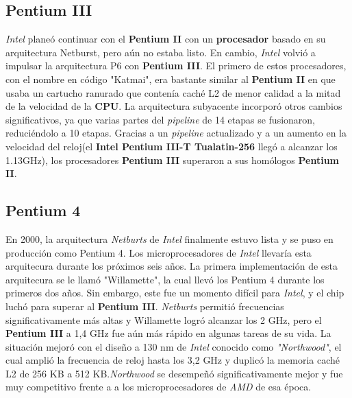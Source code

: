 \subsection{\textbf{Pentium III}}
\emph{Intel} planeó continuar con el \textbf{Pentium II} con un \textbf{procesador} basado en su arquitectura Netburst, pero aún no estaba listo. En cambio, \emph{Intel} volvió a impulsar la 
arquitectura P6 con \textbf{Pentium III}. El primero de estos procesadores, con el nombre en código "Katmai", era bastante similar al \textbf{Pentium II} en que usaba un cartucho 
ranurado que contenía caché L2 de menor calidad a la mitad de la velocidad de la \textbf{CPU}. La arquitectura subyacente incorporó otros cambios significativos, ya que varias 
partes del \emph{pipeline} de 14 etapas se fusionaron, reduciéndolo a 10 etapas. Gracias a un \emph{pipeline} actualizado y a un aumento en la velocidad del 
reloj(el \textbf{Intel Pentium III-T Tualatin-256} llegó a alcanzar los 1.13GHz), los procesadores \textbf{Pentium III} superaron a sus homólogos \textbf{Pentium II}.

\subsection{\textbf{Pentium 4}}
En 2000, la arquitectura \emph{Netburts} de \emph{Intel} finalmente estuvo lista y se puso en producción como Pentium 4. Los microprocesadores de \emph{Intel} llevaría esta 
arquitecura durante los próximos seis años. La primera implementación de esta arquitecura se le llamó "Willamette", la cual llevó los Pentium 4 
durante los primeros dos años. Sin embargo, este fue un momento difícil para \emph{Intel}, y el chip luchó para superar al \textbf{Pentium III}. \emph{Netburts} permitió 
frecuencias significativamente más altas y Willamette logró alcanzar los 2 GHz, pero el \textbf{Pentium III} a 1,4 GHz fue aún más rápido en algunas tareas
de su vida. La situación mejoró con el diseño a 130 nm de \emph{Intel} conocido como \emph{"Northwood"}, el cual  amplió la frecuencia de reloj hasta los 3,2 GHz y 
duplicó la memoria caché L2 de 256 KB a 512 KB.\emph{Northwood} se desempeñó significativamente mejor y fue muy competitivo frente a a los microprocesadores 
de \emph{AMD} de esa época.


